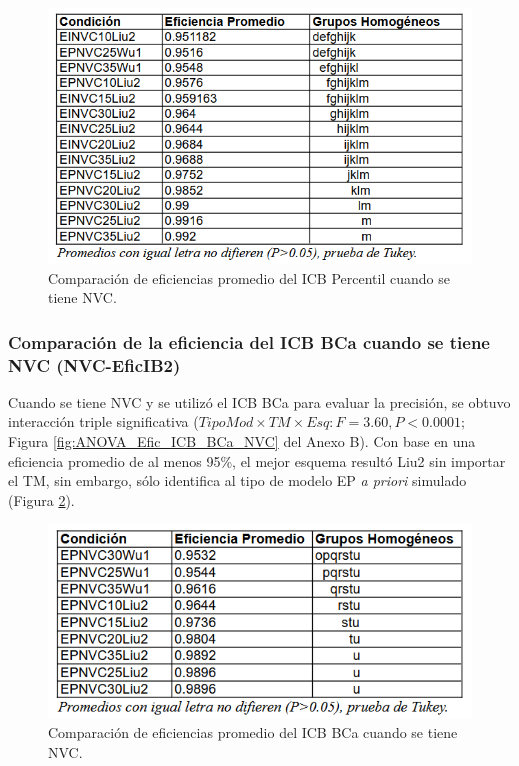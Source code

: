 \begin{figure}[ht] 
	\centering 
	\includegraphics[width=0.76\linewidth]{img/CompEfic_PromICB_Perc_NVC.png} 
	\caption{Comparación de eficiencias promedio del ICB Percentil cuando se tiene NVC.} 
	\label{fig:CompEfic_PromICB_Perc_NVC}
\end{figure}
\FloatBarrier



\subsubsection{Comparación de la eficiencia del ICB BCa cuando se tiene NVC (NVC-EficIB2)}

Cuando se tiene NVC y se utilizó el ICB BCa para evaluar la precisión, se obtuvo interacción triple significativa ($TipoMod \times TM \times Esq: F=3.60, P<0.0001;$ Figura \ref{fig:ANOVA_Efic_ICB_BCa_NVC} del Anexo B). Con base en una eficiencia promedio de al menos 95\%, el mejor esquema resultó Liu2 sin importar el TM, sin embargo, sólo identifica al tipo de modelo EP \textit{a priori} simulado (Figura \ref{fig:CompEfic_PromICB_BCa_NVC}).\\



\begin{figure}[ht] 
	\centering 
	\includegraphics[width=0.76\linewidth]{img/CompEfic_PromICB_BCa_NVC.png} 
	\caption{Comparación de eficiencias promedio del ICB BCa cuando se tiene NVC.} 
	\label{fig:CompEfic_PromICB_BCa_NVC}
\end{figure}
\FloatBarrier



